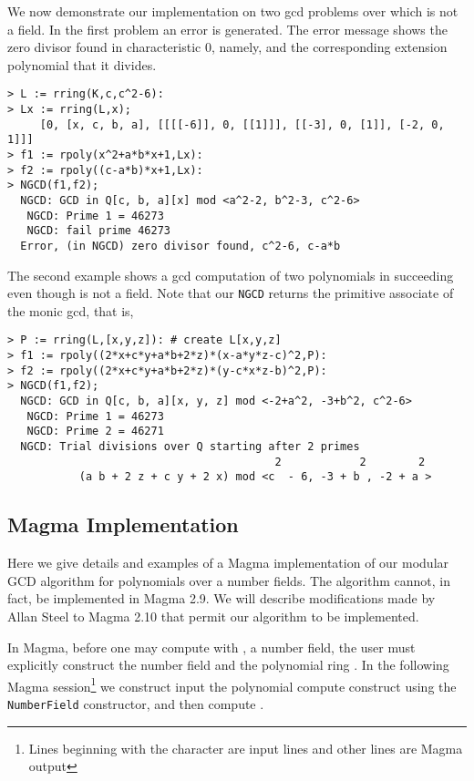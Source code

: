 \documentclass[10pt]{article}
\begin{document}
\noindent We now demonstrate our implementation on two gcd problems
over  which is not a field. In the
first problem an error is generated. The error message shows the
zero divisor found in characteristic 0, namely,  and the
corresponding extension polynomial  that it divides.


{ \small
\begin{verbatim}
> L := rring(K,c,c^2-6):
> Lx := rring(L,x);
     [0, [x, c, b, a], [[[[-6]], 0, [[1]]], [[-3], 0, [1]], [-2, 0, 1]]]
> f1 := rpoly(x^2+a*b*x+1,Lx):
> f2 := rpoly((c-a*b)*x+1,Lx):
> NGCD(f1,f2);
  NGCD: GCD in Q[c, b, a][x] mod <a^2-2, b^2-3, c^2-6>
   NGCD: Prime 1 = 46273
   NGCD: fail prime 46273
  Error, (in NGCD) zero divisor found, c^2-6, c-a*b
\end{verbatim}
}

\noindent The second example shows a gcd computation of two
polynomials in  succeeding even though  is not a field.
Note that our {\tt NGCD} returns the primitive associate of the
monic gcd, that is, 
{ \small
\begin{verbatim}
> P := rring(L,[x,y,z]): # create L[x,y,z]
> f1 := rpoly((2*x+c*y+a*b+2*z)*(x-a*y*z-c)^2,P):
> f2 := rpoly((2*x+c*y+a*b+2*z)*(y-c*x*z-b)^2,P):
> NGCD(f1,f2);
  NGCD: GCD in Q[c, b, a][x, y, z] mod <-2+a^2, -3+b^2, c^2-6>
   NGCD: Prime 1 = 46273
   NGCD: Prime 2 = 46271
  NGCD: Trial divisions over Q starting after 2 primes
                                         2            2        2
           (a b + 2 z + c y + 2 x) mod <c  - 6, -3 + b , -2 + a >
\end{verbatim}
}



 

\subsection{Magma Implementation}



Here we give details and examples of a Magma implementation of our
modular GCD algorithm for polynomials over a number fields. The
algorithm cannot, in fact, be implemented in Magma 2.9. We will
describe modifications made by Allan Steel to Magma 2.10 that permit
our algorithm to be implemented.

In Magma, before one may compute with ,  a number
field, the user must explicitly construct the number field  and
the polynomial ring . In the following Magma
session\footnote{Lines beginning with the  character are input
lines and other lines are Magma output} we construct  input
the polynomial  compute  construct  using the {\tt NumberField}
constructor, and then compute .
\end{document}

